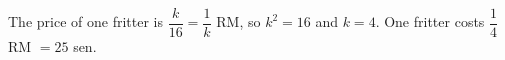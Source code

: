 The price of one fritter is $\dfrac{k}{16}=\dfrac1k$ RM, so $k^2=16$ and $k=4$. One fritter costs $\dfrac14$ RM $=\boxed{25}$ sen.

